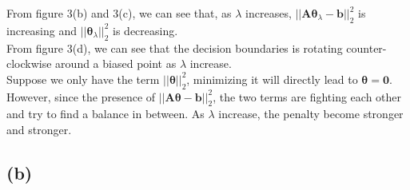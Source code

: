 \documentclass[11pt]{article}
\begin{document}
From figure 3(b) and 3(c), we can see that, as $\lambda$ increases, $||\pmb{A\theta}_\lambda-\pmb{b}||^2_2$ is increasing and $||\pmb{\theta}_\lambda||^2_2$ is decreasing.\\
From figure 3(d), we can see that the decision boundaries is rotating counter-clockwise around a biased point as $\lambda$ increase.\\
Suppose we only have the term $||\pmb{\theta}||^2_2$, minimizing it will directly lead to $\pmb{\theta}=\pmb{0}$. However, since the presence of $||\pmb{A\theta}-\pmb{b}||^2_2$, the two terms are fighting each other and try to find a balance in between. As $\lambda$ increase, the penalty become stronger and stronger.
\pagebreak
\subsection*{(b)}
\end{document}
